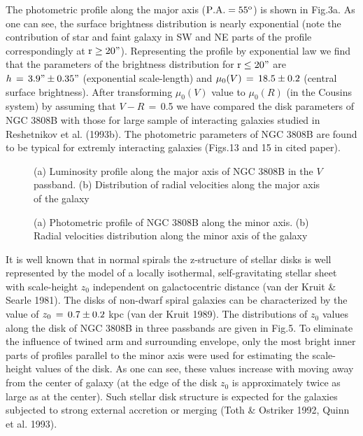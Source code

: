 The photometric profile along the major axis ($\rm P.A.=55^{o}$)
is shown in Fig.3a. As one can see, the surface brightness distribution 
is nearly exponential (note the contribution  
of star and faint galaxy in SW and NE parts of the
profile correspondingly at $\rm r\geq20"$). Representing the profile
by exponential law we find that the parameters of the brightness
distribution for $\rm r\le20"$ are $h\,=\rm\,3.9"\pm0.35"$
(exponential scale-length) and $\mu_{0}(V)\,=\rm\,18.5\pm0.2$ (central
surface brightness). After transforming $\mu_{0}(V)$ value to 
$\mu_{0}(R)$ (in the Cousins system) by assuming that $V-R\,=\,$0.5 we 
have compared the disk parameters of NGC 3808B with those for large
sample of interacting galaxies studied in Reshetnikov et al. (1993b).
The photometric parameters of NGC 3808B are found to be typical for
extremly interacting galaxies (Figs.13 and 15 in cited paper).

\begin{figure}
\picplace{1.5cm}
\caption[3]{(a) Luminosity profile along the major axis of NGC 3808B
in the $V$ passband. (b) Distribution of radial velocities along
the major axis of the galaxy}
\end{figure}

\begin{figure}
\picplace{1.5cm}
\caption[4]{(a) Photometric profile of NGC 3808B along the minor
axis. (b) Radial velocities distribution along the minor axis
of the galaxy}
\end{figure}

It is well known that in normal spirals the z-structure of stellar
disks is well represented by the model of a locally isothermal,
self-gravitating stellar sheet with scale-height $z_{0}$ independent
on galactocentric distance (van der Kruit \& Searle 1981). The disks
of non-dwarf spiral galaxies can be characterized by the value of
$z_{0}\,=\rm\,0.7\pm0.2$ kpc (van der Kruit 1989). The distributions
of $z_{0}$ values along the disk of NGC 3808B in three passbands are
given in Fig.5. To eliminate the influence of twined arm and surrounding
envelope, only the most bright inner parts of profiles parallel to the
minor axis were used for estimating the scale-height values of the disk. 
As one can see, these values increase with moving away from the center
of galaxy (at the edge of the disk $z_{0}$  is approximately twice as
large as at the center). Such stellar disk structure is expected
for the galaxies subjected to strong external accretion or merging
(Toth \& Ostriker 1992, Quinn et al. 1993).

